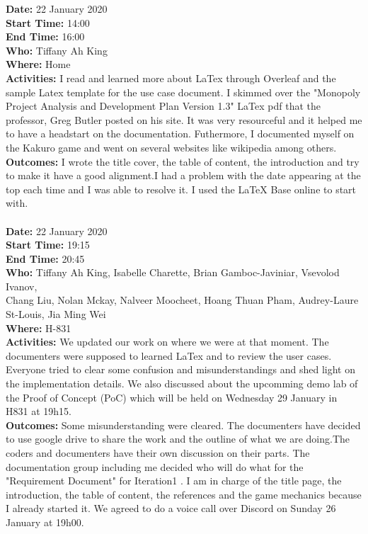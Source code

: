 \documentclass[12pt]{article}
\begin{document}
{\bf Date:} 22 January 2020\\
{\bf Start Time:} 14:00\\
{\bf End Time:} 16:00\\
{\bf Who:} Tiffany Ah King\\
{\bf Where:} Home\\
{\bf Activities:} I read and learned more about LaTex through Overleaf and the sample Latex template for the use case document. I skimmed over the "Monopoly Project Analysis and Development Plan Version 1.3" LaTex pdf that the professor, Greg Butler posted on his site. It was very resourceful and it helped me to have a headstart on the documentation. Futhermore, I documented myself on the Kakuro game and went on several websites like wikipedia among others.\\
{\bf Outcomes:} I wrote the title cover, the table of content, the introduction and try to make it have a good alignment.I had a problem with the date appearing at the top each time and I was able to resolve it. I used the LaTeX Base online to start with.\\ \\

{\bf Date:} 22 January 2020\\
{\bf Start Time:} 19:15\\
{\bf End Time:} 20:45\\
{\bf Who:} Tiffany Ah King, Isabelle Charette, Brian Gamboc-Javiniar, Vsevolod Ivanov,\\
Chang Liu, Nolan Mckay, Nalveer Moocheet, Hoang Thuan Pham, Audrey-Laure St-Louis, Jia Ming Wei\\
{\bf Where:} H-831\\
{\bf Activities:} We updated our work on where we were at that moment. The documenters were supposed to learned LaTex and to review  the user cases. Everyone tried to clear some confusion and misunderstandings and shed light on the implementation details. We also discussed about the upcomming demo lab of the Proof of Concept (PoC) which will be held on Wednesday 29 January in H831 at 19h15.\\
{\bf Outcomes:} Some misunderstanding were cleared. The documenters have decided to use google drive to share the work and the outline of what we are doing.The coders and documenters have their own discussion on their parts. The documentation group including me decided who will do what for the "Requirement Document" for Iteration1 . I am in charge of the title page, the introduction, the table of content, the references and the game mechanics because I already started it. We agreed to do a voice call over Discord on Sunday 26 January at 19h00. \\ \\ 
\end{document}
